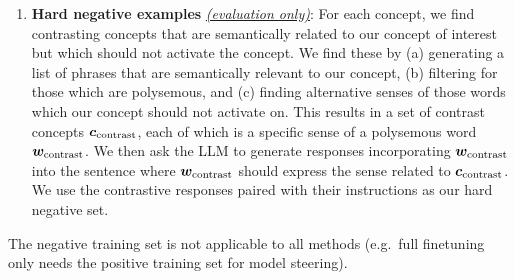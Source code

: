 \documentclass{article}
\theoremstyle{plain}
\theoremstyle{definition}
\theoremstyle{remark}
\begin{document}
\begin{enumerate}
    \item \textbf{Hard negative examples} \underline{\textit{(evaluation only)}}: For each concept, we find contrasting concepts that are semantically related to our concept of interest but which should not activate the concept. We find these by (a) generating a list of phrases that are semantically relevant to our concept, (b) filtering for those which are polysemous, and (c) finding alternative senses of those words which our concept should not activate on. This results in a set of contrast concepts ${\bm{c}}_{\text{contrast}}$, each of which is a specific sense of a polysemous word ${\bm{w}}_{\text{contrast}}$. We then ask the LLM to generate responses incorporating ${\bm{w}}_{\text{contrast}}$ into the sentence where ${\bm{w}}_{\text{contrast}}$ should express the sense related to ${\bm{c}}_{\text{contrast}}$. We use the contrastive responses paired with their instructions as our hard negative set.
\end{enumerate}

The negative training set is not applicable to all methods (e.g.\ full finetuning only needs the positive training set for model steering).

\end{document}
